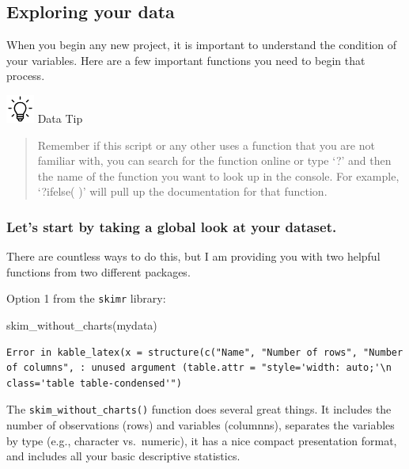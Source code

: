 \documentclass[
]{book}
\newenvironment{Shaded}{\begin{snugshade}}{\end{snugshade}}
\newcommand{\FunctionTok}[1]{\textcolor[rgb]{0.00,0.00,0.00}{#1}}
\newcommand{\NormalTok}[1]{#1}
\begin{document}
\hypertarget{exploring-your-data-1}{%
\subsection*{Exploring your data}\label{exploring-your-data-1}}

When you begin any new project, it is important to understand the condition of your variables. Here are a few important functions you need to begin that process.

\includegraphics[width=0.36458in,height=\textheight]{images/bulb.png} Data Tip

\begin{quote}
Remember if this script or any other uses a function that you are not familiar with, you can search for the function online or type `?' and then the name of the function you want to look up in the console. For example, `?ifelse( )' will pull up the documentation for that function.
\end{quote}

\hypertarget{global}{%
\subsubsection*{Let's start by taking a global look at your dataset.}\label{global}}

There are countless ways to do this, but I am providing you with two helpful functions from two different packages.

Option 1 from the \texttt{skimr} library:

\begin{Shaded}
\begin{Highlighting}[]
\FunctionTok{skim\_without\_charts}\NormalTok{(mydata)}
\end{Highlighting}
\end{Shaded}

\begin{verbatim}
Error in kable_latex(x = structure(c("Name", "Number of rows", "Number of columns", : unused argument (table.attr = "style='width: auto;'\n        class='table table-condensed'")
\end{verbatim}

The \texttt{skim\_without\_charts()} function does several great things. It includes the number of observations (rows) and variables (columnns), separates the variables by type (e.g., character vs.~numeric), it has a nice compact presentation format, and includes all your basic descriptive statistics.
\end{document}
